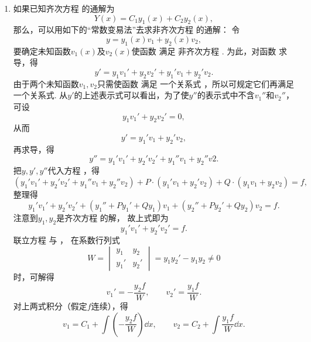 \begin{enumerate}
\item%
如果已知齐次方程  的通解为\[
Y(x) = C_1 y_1(x) + C_2 y_2(x),
\]那么，可以用如下的“常数变易法”去求非齐次方程  的通解：
令\begin{equation}\label{equation:微分方程.二阶非齐次线性微分方程的通解设想}
y = y_1(x) v_1 + y_2(x) v_2,
\end{equation}
要确定未知函数\(v_1(x)\)及\(v_2(x)\)使函数  满足%
非齐次方程 .
为此，对函数  求导，得\[
y' = y_1 v_1' + y_2 v_2' + y_1' v_1 + y_2' v_2.
\]
由于两个未知函数\(v_1,v_2\)只需使函数  满足%
一个关系式 ，所以可规定它们再满足一个关系式.
从\(y'\)的上述表示式可以看出，为了使\(y''\)的表示式中不含\(v_1''\)和\(v_2''\)，可设\begin{equation}\label{equation:微分方程.二阶非齐次线性微分方程的额外条件1}
y_1 v_1' + y_2 v_2' = 0,
\end{equation}从而\[
y' = y_1' v_1 + y_2' v_2,
\]再求导，得\[
y'' = y_1' v_1' + y_2' v_2' + y_1'' v_1 + y_2'' v2.
\]把\(y,y',y''\)代入方程 ，得\[
(y_1' v_1' + y_2' v_2' + y_1'' v_1 + y_2'' v_2)
+P\cdot(y_1' v_1 + y_2' v_2) + Q\cdot(y_1 v_1 + y_2 v_2) = f,
\]整理得\[
y_1' v_1' + y_2' v_2'
+ (y_1'' + P y_1' + Q y_1) v_1
+ (y_2'' + P y_2' + Q y_2) v_2
= f.
\]注意到\(y_1,y_2\)是齐次方程  的解，%
故上式即为
\begin{equation}\label{equation:微分方程.二阶非齐次线性微分方程的额外条件2}
y_1' v_1' + y_2' v_2' = f.
\end{equation}
联立方程  与 ，%
在系数行列式\[
W = \begin{vmatrix} y_1 & y_2 \\ y_1' & y_2' \end{vmatrix}
= y_1 y_2' - y_1 y_2 \neq0
\]时，可解得\[
v_1' = -\frac{y_2 f}{W},
\qquad
v_2' = \frac{y_1 f}{W}.
\]
对上两式积分（假定\(f\)连续），得\[
v_1 = C_1 + \int \left(-\frac{y_2 f}{W}\right) \dd{x},
\qquad
v_2 = C_2 + \int \frac{y_1 f}{W} \dd{x}.
\]


\end{enumerate}
